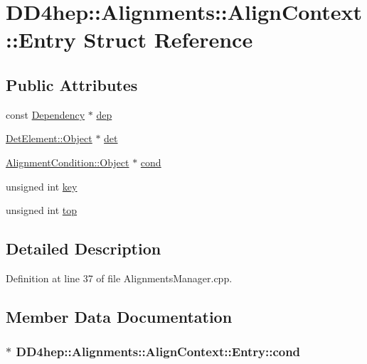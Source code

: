 \hypertarget{struct_d_d4hep_1_1_alignments_1_1_align_context_1_1_entry}{
\section{DD4hep::Alignments::AlignContext::Entry Struct Reference}
\label{struct_d_d4hep_1_1_alignments_1_1_align_context_1_1_entry}
}
\subsection*{Public Attributes}
\begin{DoxyCompactItemize}
\item 
const \hyperlink{class_d_d4hep_1_1_conditions_1_1_condition_dependency}{Dependency} $\ast$ \hyperlink{struct_d_d4hep_1_1_alignments_1_1_align_context_1_1_entry_a9e19872212429d2e48675c52c480aa35}{dep}
\item 
\hyperlink{class_d_d4hep_1_1_geometry_1_1_det_element_object}{DetElement::Object} $\ast$ \hyperlink{struct_d_d4hep_1_1_alignments_1_1_align_context_1_1_entry_a746553aaf4056ce6511a17c7929dde44}{det}
\item 
\hyperlink{class_d_d4hep_1_1_alignments_1_1_interna_1_1_alignment_condition_object}{AlignmentCondition::Object} $\ast$ \hyperlink{struct_d_d4hep_1_1_alignments_1_1_align_context_1_1_entry_ab3e3d013e2e3b3d978f38a1f32d806da}{cond}
\item 
unsigned int \hyperlink{struct_d_d4hep_1_1_alignments_1_1_align_context_1_1_entry_a11ecca8923ec80803028766427ce25eb}{key}
\item 
unsigned int \hyperlink{struct_d_d4hep_1_1_alignments_1_1_align_context_1_1_entry_aa5d088f1704ee169e740e841721f2b2e}{top}
\end{DoxyCompactItemize}


\subsection{Detailed Description}


Definition at line 37 of file AlignmentsManager.cpp.

\subsection{Member Data Documentation}
\hypertarget{struct_d_d4hep_1_1_alignments_1_1_align_context_1_1_entry_ab3e3d013e2e3b3d978f38a1f32d806da}{
\subsubsection[{cond}]{$\ast$ {\bf DD4hep::Alignments::AlignContext::Entry::cond}}}
\label{struct_d_d4hep_1_1_alignments_1_1_align_context_1_1_entry_ab3e3d013e2e3b3d978f38a1f32d806da}


